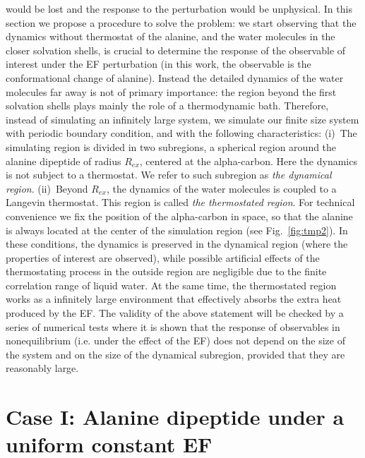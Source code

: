 \documentclass[a4paper,preprint,unsortedaddress,onecolumn]{revtex4-1}
\begin{document}
would be lost and the response to the perturbation would be unphysical. 
In this section we propose a procedure to solve the problem: we
start observing that the dynamics without thermostat of the alanine, 
and the water molecules in the closer solvation shells, is
crucial to determine the response of the observable of interest
under the EF perturbation
(in this work, the observable is the conformational change of alanine).
Instead the detailed dynamics of
the water molecules far away is not of primary importance: the region beyond the first solvation shells plays mainly the role of a thermodynamic bath. 
Therefore, instead of simulating an infinitely
large system, we simulate our finite size system with periodic
boundary condition, and with the following characteristics:
(i)~The simulating region is divided in two
subregions, a spherical region around the alanine dipeptide of radius $R_{ex}$,
centered at the alpha-carbon. Here the dynamics is
not subject to a thermostat.
We refer to such subregion as \emph{the  dynamical
region}. (ii)~Beyond $R_{ex}$, the dynamics of the water molecules is coupled
to a Langevin thermostat.  This region is called \emph{the thermostated
region}. For technical convenience we
fix the position of the alpha-carbon in space, so that the alanine is always
located at the center of the simulation region (see Fig.~\ref{fig:tmp2}).
In these conditions, the  dynamics is preserved in the dynamical region (where the properties of interest are observed), while 
possible artificial effects of the thermostating process in the outside region
are negligible due to the finite correlation
range of liquid water.
At the same time, the thermostated region works as a infinitely large
environment that effectively absorbs the extra heat produced by the EF.
The validity of the above
statement will be checked by a series of numerical tests where it is shown that
the response of observables in nonequilibrium (i.e. under the effect of the EF) does not depend on the size of the system
and on the size of the  dynamical subregion, provided that they are
reasonably large.

\section{Case I: Alanine dipeptide
  under a uniform  constant EF}
\end{document}
